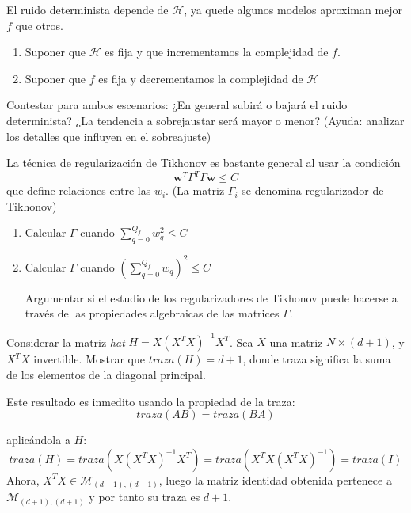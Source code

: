 \documentclass[11pt,leqno]{article}
\theoremstyle{definition}
\begin{document}
\begin{cuestion}
El ruido determinista depende de $\mathcal{H}$, ya quede algunos modelos aproximan mejor $f$ que otros.
\begin{enumerate}
\item Suponer que $\mathcal{H}$ es fija y que incrementamos la complejidad de $f$.
\item Suponer que $f$ es fija y decrementamos la complejidad de $\mathcal{H}$
\end{enumerate}

Contestar para ambos escenarios: ¿En general subirá o bajará el ruido determinista? ¿La tendencia a sobrejaustar será mayor o menor? (Ayuda: analizar los detalles que influyen en
el sobreajuste)
\end{cuestion}

\begin{solucion} 
\end{solucion}

\begin{cuestion}
La técnica de regularización de Tikhonov es bastante general al usar la condición
\[ \mathbf{w}^T \Gamma^T \Gamma \mathbf{w} \leq C	\]
que define relaciones entre las $w_i$. (La matriz $\Gamma_i$ se denomina regularizador de Tikhonov)
\begin{enumerate}[a]
\item Calcular $\Gamma$ cuando $\sum\limits_{q=0}^{Q_f} w_q^2 \leq C$
\item Calcular $\Gamma$ cuando $(\sum\limits_{q=0}^{Q_f} w_q)^2 \leq C$

Argumentar si el estudio de los regularizadores de Tikhonov puede hacerse a través de las propiedades algebraicas de las matrices $\Gamma$.

\end{enumerate}
\end{cuestion}

\begin{solucion}
\end{solucion}


\begin{cuestionopcional}
Considerar la matriz \textit{hat} $H = X(X^T X)^{-1}X^T$. Sea $X$ una matriz $N \times (d + 1)$, y $X^T X$
invertible. Mostrar que $traza(H) = d + 1$, donde traza significa la suma de los elementos de la diagonal principal. 
\end{cuestionopcional}

\begin{solucionopcional}
Este resultado es inmedito usando la propiedad de la traza:
	\[ traza(AB) = traza(BA)	\]

aplicándola a $H$:
	\[ traza(H) = traza(X(X^T X)^{-1}X^T) = traza( X^T X (X^T X)^{-1}) = traza(I)	\]
Ahora, $X^T X \in \mathcal{M}_{(d+1),(d+1)}$, luego la matriz identidad obtenida pertenece a $\mathcal{M}_{(d+1),(d+1)}$ y por tanto su traza es $d+1$.
\end{solucionopcional}
\end{document}
